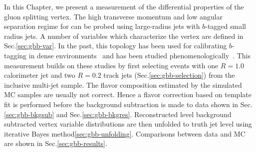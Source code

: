 In this Chapter, we present a measurement of the differential properties of the gluon splitting vertex. The high transverse momentum and low angular separation regime for \gbb can be probed using large-radius jets with $b$-tagged small radius jets. A number of variables which characterize the \gbb vertex are defined in Sec.\ref{sec:gbb-var}. In the past, this topology has been used for calibrating $b$-tagging in dense environments~\cite{ATLAS-CONF-2016-039,ATLAS-CONF-2016-002,CMS:2013vea} and has been studied phenomenologically~\cite{Anderle:2017qwx,Ilten:2017rbd}. This measurement builds on these studies by first selecting events with one $R=1.0$ calorimeter jet and two $R=0.2$ track jets (Sec.\ref{sec:gbb-selection}) from the inclusive multi-jet sample. The flavor composition estimated by the simulated MC samples are usually not correct. Hence a flavor correction based on \sdzero template fit is performed before the background subtraction is made to data shown in Sec.\ref{sec:gbb-bkgsub} and Sec.\ref{sec:gbb-bkgres}. Reconstructed level background subtracted \gbb vertex variable distributions are then unfolded to truth jet level using iterative Bayes method\ref{sec:gbb-unfolding}. Comparisons between data and MC are shown in Sec.\ref{sec:gbb-results}.
